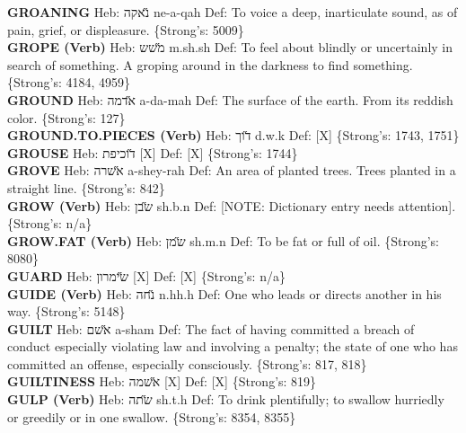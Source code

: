 {\textbf{GROANING} Heb: {\large\H נאקה} ne-a-qah Def: To voice a deep, inarticulate sound, as of pain, grief, or displeasure. \{Strong's: 5009\}\hfill{}\\

\textbf{GROPE (Verb)} Heb: {\large\H משש} m.sh.sh Def: To feel about blindly or uncertainly in search of something. A groping around in the darkness to find something. \{Strong's: 4184, 4959\}\hfill{}\\

\textbf{GROUND} Heb: {\large\H אדמה} a-da-mah Def: The surface of the earth. From its reddish color. \{Strong's: 127\}\hfill{}\\

\textbf{GROUND.TO.PIECES (Verb)} Heb: {\large\H דוך} d.w.k Def: {[}X{]} \{Strong's: 1743, 1751\}\hfill{}\\

\textbf{GROUSE} Heb: {\large\H דוכיפת} {[}X{]} Def: {[}X{]} \{Strong's: 1744\}\hfill{}\\

\textbf{GROVE} Heb: {\large\H אשרה} a-shey-rah Def: An area of planted trees. Trees planted in a straight line. \{Strong's: 842\}\hfill{}\\

\textbf{GROW (Verb)} Heb: {\large\H שבן} sh.b.n Def: {[}NOTE: Dictionary entry needs attention{]}. \{Strong's: n/a\}\hfill{}\\

\textbf{GROW.FAT (Verb)} Heb: {\large\H שמן} sh.m.n Def: To be fat or full of oil. \{Strong's: 8080\}\hfill{}\\

\textbf{GUARD} Heb: {\large\H שימרון} {[}X{]} Def: {[}X{]} \{Strong's: n/a\}\hfill{}\\

\textbf{GUIDE (Verb)} Heb: {\large\H נחה} n.hh.h Def: One who leads or directs another in his way. \{Strong's: 5148\}\hfill{}\\

\textbf{GUILT} Heb: {\large\H אשם} a-sham Def: The fact of having committed a breach of conduct especially violating law and involving a penalty; the state of one who has committed an offense, especially consciously. \{Strong's: 817, 818\}\hfill{}\\

\textbf{GUILTINESS} Heb: {\large\H אשמה} {[}X{]} Def: {[}X{]} \{Strong's: 819\}\hfill{}\\

\textbf{GULP (Verb)} Heb: {\large\H שתה} sh.t.h Def: To drink plentifully; to swallow hurriedly or greedily or in one swallow. \{Strong's: 8354, 8355\}\hfill{}\\

}
